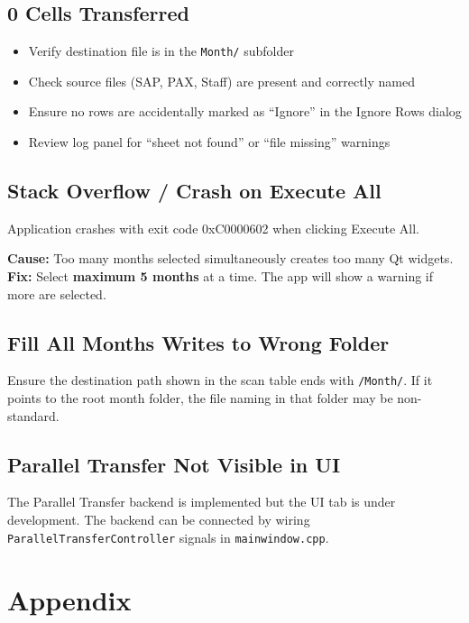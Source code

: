 \documentclass[11pt,a4paper]{article}
\begin{document}
\subsection{0 Cells Transferred}
\begin{itemize}[leftmargin=*, itemsep=4pt]
\item Verify destination file is in the \texttt{Month/} subfolder
\item Check source files (SAP, PAX, Staff) are present and correctly named
\item Ensure no rows are accidentally marked as ``Ignore'' in the Ignore Rows dialog
\item Review log panel for ``sheet not found'' or ``file missing'' warnings
\end{itemize}

\subsection{Stack Overflow / Crash on Execute All}
\begin{warningbox}[Symptom]
Application crashes with exit code 0xC0000602 when clicking Execute All.
\end{warningbox}
\textbf{Cause:} Too many months selected simultaneously creates too many Qt widgets.\\
\textbf{Fix:} Select \textbf{maximum 5 months} at a time. The app will show a warning if more are selected.

\subsection{Fill All Months Writes to Wrong Folder}
Ensure the destination path shown in the scan table ends with \texttt{/Month/}. If it points to the root month folder, the file naming in that folder may be non-standard.

\subsection{Parallel Transfer Not Visible in UI}
The Parallel Transfer backend is implemented but the UI tab is under development. The backend can be connected by wiring \texttt{ParallelTransferController} signals in \texttt{mainwindow.cpp}.

\newpage  %

\section{Appendix}
\end{document}
